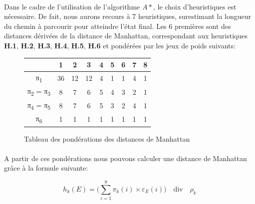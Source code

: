 \documentclass[10pt,a4paper]{report}
\begin{document}
\paragraph{} {Dans le cadre de l'utilisation de l'algorithme ${A*}$, le choix d'heuristiques est nécessaire. De fait, nous aurons recours à 7 heuristiques, surestimant la longueur du chemin à parcourir pour atteindre l'état final. Les 6 premières sont des distances dérivées de la distance de Manhattan, correspondant aux heuristiques {\bfseries H.1}, {\bfseries H.2}, {\bfseries H.3}, {\bfseries H.4}, {\bfseries H.5}, {\bfseries H.6} et pondérées par les jeux de poids suivants:}
{\scriptsize{}
\renewcommand{\arraystretch}{1.3}
\vspace*{1cm}
\begin{figure}[h!]
\centering
\begin{tabular}
{| c || c | c | c | c | c | c | c | c |} \hline \textbf{ } & \textbf{1} & \textbf{2} & \textbf{3} & \textbf{4} & \textbf{5} & \textbf{6} & \textbf{7} & \textbf{8} \\ \hline \hline
π\textsubscript{1} & 36 & 12 & 12 & 4 & 1 & 1 & 4 & 1  \\ \hline
π\textsubscript{2} = π\textsubscript{3} & 8 & 7 & 6 & 5 & 4 & 3 & 2 & 1 \\ \hline
π\textsubscript{4} = π\textsubscript{5} & 8 & 7 & 6 & 5 & 3 & 2 & 4 & 1 \\ \hline
π\textsubscript{6} & 1 & 1 & 1 & 1 & 1 & 1 & 1 & 1 \\ \hline
\end{tabular}
\caption{Tableau des pondérations des distances de Manhattan}
\label{ponderations}
\end{figure} \vspace*{1cm}}
\paragraph{}{A partir de ces pondérations nous pouvons calculer une distance de Manhattan grâce à la formule suivante:}
\begin{figure}[h!]
\centering
\[{h}_{k}({E})=\Bigg({\sum_{i=1}^{8}}\pi _{k}(i) \times \varepsilon _{E}(i)\Bigg) \quad \textrm{div} \quad \rho _{k}\]
\label{calculponderations}
\end{figure}
\end{document}
